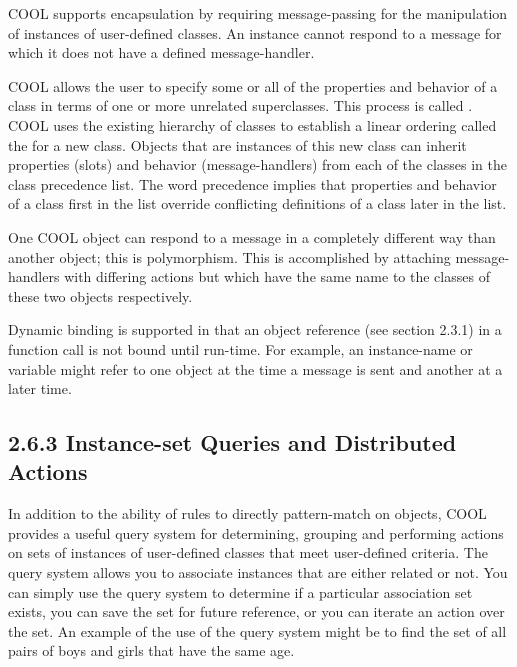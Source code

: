 \documentclass[letterpaper,10pt,english]{sphinxmanual}
\begin{document}
COOL supports encapsulation by requiring message-passing for the
manipulation of instances of user-defined classes. An instance cannot
respond to a message for which it does not have a defined
message-handler.

COOL allows the user to specify some or all of the properties and
behavior of a class in terms of one or more unrelated superclasses. This
process is called . COOL uses the existing
hierarchy of classes to establish a linear ordering called the  for a new class. Objects that are instances of this
new class can inherit properties (slots) and behavior (message-handlers)
from each of the classes in the class precedence list. The word
precedence implies that properties and behavior of a class first in the
list override conflicting definitions of a class later in the list.

One COOL object can respond to a message in a completely different way
than another object; this is polymorphism. This is accomplished by
attaching message-handlers with differing actions but which have the
same name to the classes of these two objects respectively.

Dynamic binding is supported in that an object reference (see section
2.3.1) in a  function call is not bound until run-time. For
example, an instance-name or variable might refer to one object at the
time a message is sent and another at a later time.


\subsection{2.6.3 Instance-set Queries and Distributed Actions}
\label{\detokenize{overview:instance-set-queries-and-distributed-actions}}
In addition to the ability of rules to directly pattern-match on
objects, COOL provides a useful query system for determining, grouping
and performing actions on sets of instances of user-defined classes that
meet user-defined criteria. The query system allows you to associate
instances that are either related or not. You can simply use the query
system to determine if a particular association set exists, you can save
the set for future reference, or you can iterate an action over the set.
An example of the use of the query system might be to find the set of
all pairs of boys and girls that have the same age.
\end{document}
